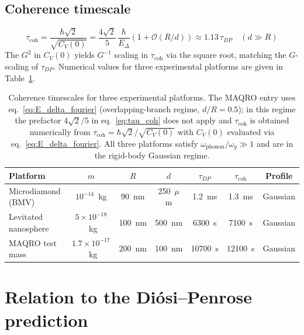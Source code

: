 \documentclass[12pt,a4paper]{article}
\begin{document}
\subsection{Coherence timescale}

\begin{equation}
\tau_{\text{coh}} = \frac{\hbar\sqrt{2}}{\sqrt{C_V(0)}}
= \frac{4\sqrt{2}}{5}\,\frac{\hbar}{E_\Delta}\left(1 + \mathcal{O}(R/d)\right)
\approx 1.13\,\tau_{DP} \quad (d \gg R)
\label{eq:tau_coh}
\end{equation}
The $G^2$ in $C_V(0)$ yields $G^{-1}$ scaling in $\tau_{\text{coh}}$ via the square root,
matching the $G$-scaling of $\tau_{DP}$. Numerical values for three experimental platforms
are given in Table~\ref{tab:platforms}.

\begin{table}[h]
\centering
\begin{tabular}{lcccccc}
\toprule
Platform & $m$ & $R$ & $d$ & $\tau_{DP}$ & $\tau_{\text{coh}}$ & Profile \\
\midrule
Microdiamond (BMV)~\cite{bose} & $10^{-14}$~kg & 90~nm & 250~$\mu$m & 1.2~ms & 1.3~ms & Gaussian \\
Levitated nanosphere & $5\times10^{-18}$~kg & 100~nm & 500~nm & 6300~s & 7100~s & Gaussian \\
MAQRO test mass~\cite{maqro} & $1.7\times10^{-17}$~kg & 200~nm & 100~nm & 10700~s & 12100~s & Gaussian \\
\bottomrule
\end{tabular}
\caption{Coherence timescales for three experimental platforms. The MAQRO entry uses
eq.~\eqref{eq:E_delta_fourier} (overlapping-branch regime, $d/R = 0.5$); in this
regime the prefactor $4\sqrt{2}/5$ in eq.~\eqref{eq:tau_coh} does not apply and
$\tau_{\text{coh}}$ is obtained numerically from $\tau_{\text{coh}} = \hbar\sqrt{2}/\sqrt{C_V(0)}$
with $C_V(0)$ evaluated via eq.~\eqref{eq:E_delta_fourier}. All three platforms
satisfy $\omega_{\text{phonon}}/\omega_g \gg 1$ and are in the rigid-body Gaussian regime.}
\label{tab:platforms}
\end{table}

\section{Relation to the Di\'osi--Penrose prediction}
\label{sec:dp_comparison}
\end{document}
